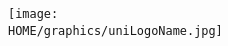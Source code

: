 \begin{slide}
\heading{}

\begin{list0}
\item
    \begin{list1}
    \item
    \end{list1}

\item
\end{list0}

\texttt{[image: \\HOME/graphics/uniLogoName.jpg]}

\end{slide}


